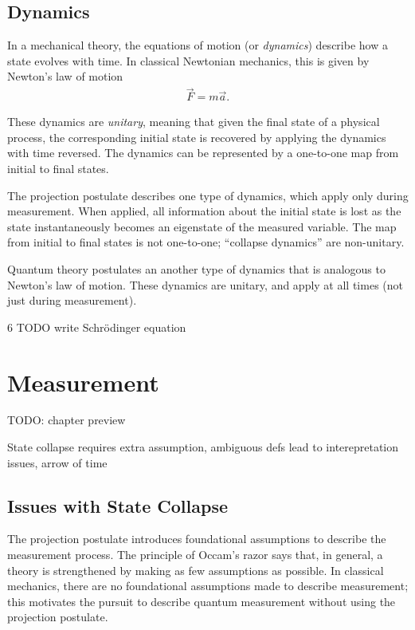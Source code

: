 \section{Dynamics}
In a mechanical theory, the equations of motion (or \textit{dynamics}) describe how a state evolves with time. In classical Newtonian mechanics, this is given by Newton's law of motion
\begin{align}
  \vec{F} = m\vec{a}.
\end{align}

These dynamics are \textit{unitary}, meaning that given the final state of a physical process, the corresponding initial state is recovered by applying the dynamics with time reversed. The dynamics can be represented by a one-to-one map from initial to final states.

The projection postulate describes one type of dynamics, which apply only during measurement. When applied, all information about the initial state is lost as the state instantaneously becomes an eigenstate of the measured variable. The map from initial to final states is not one-to-one; ``collapse dynamics'' are non-unitary.

Quantum theory postulates an another type of dynamics that is analogous to Newton's law of motion. These dynamics are unitary, and apply at all times (not just during measurement).

\begin{Thm:Postulate}{6}
  TODO write Schrödinger equation
\end{Thm:Postulate}

\chapter{Measurement}

TODO: chapter preview

State collapse requires extra assumption, ambiguous defs lead to interepretation issues, arrow of time

\section{Issues with State Collapse}

The projection postulate introduces foundational assumptions to describe the measurement process. The principle of Occam's razor says that, in general, a theory is strengthened by making as few assumptions as possible. In classical mechanics, there are no foundational assumptions made to describe measurement; this motivates the pursuit to describe quantum measurement without using the projection postulate.


